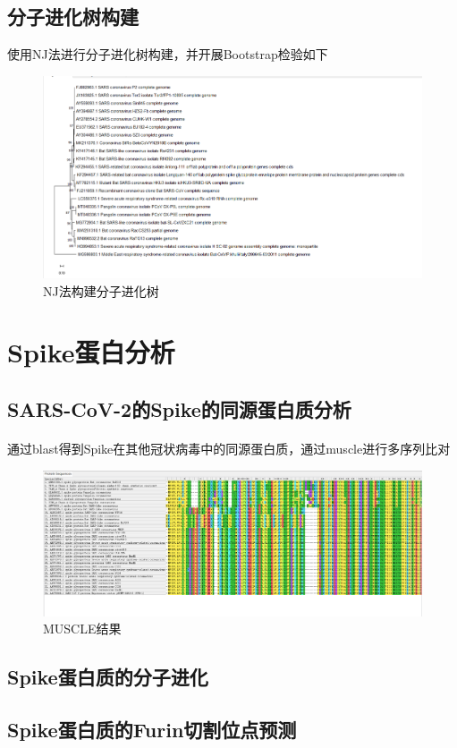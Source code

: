 \documentclass[supercite]{HustGraduPaper}
\begin{document}
  \subsection{分子进化树构建}使用NJ法进行分子进化树构建，并开展Bootstrap检验如下
	\begin{figure}[H]
		\centering
		\includegraphics[width=1\textwidth]{./material/practice3/mega.png}
		\caption{NJ法构建分子进化树}
	\end{figure}


\section{Spike蛋白分析}
  \subsection{SARS-CoV-2的Spike的同源蛋白质分析}
	  \paragraph{}\label{subpara:subpara}通过blast得到Spike在其他冠状病毒中的同源蛋白质，通过muscle进行多序列比对
		\begin{figure}[H]
			\centering
			\includegraphics[width=1\textwidth]{./material/practice4/muscle.png}
			\caption{MUSCLE结果}
		\end{figure}


	\subsection{Spike蛋白质的分子进化}

	\subsection{Spike蛋白质的Furin切割位点预测}
\end{document}
